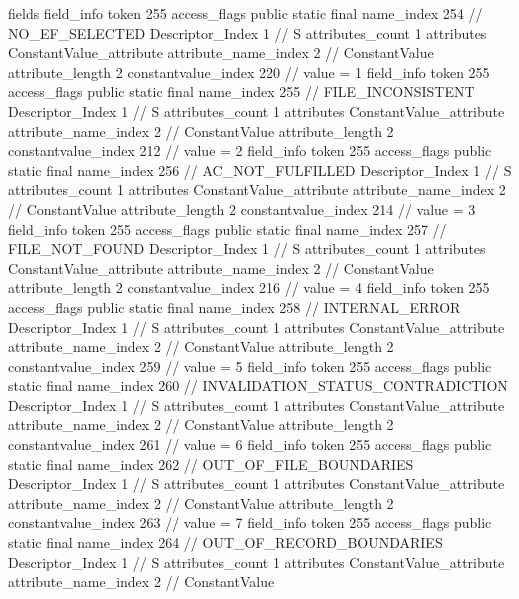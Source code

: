 {{{			fields {
			field_info {
				token	255
				access_flags	public static final
				name_index	254		// NO_EF_SELECTED
				Descriptor_Index	1		// S
				attributes_count	1
				attributes {
				ConstantValue_attribute {
					attribute_name_index	2		// ConstantValue
					attribute_length	2
					constantvalue_index	220		// value = 1
				}
				}
			}
			field_info {
				token	255
				access_flags	public static final
				name_index	255		// FILE_INCONSISTENT
				Descriptor_Index	1		// S
				attributes_count	1
				attributes {
				ConstantValue_attribute {
					attribute_name_index	2		// ConstantValue
					attribute_length	2
					constantvalue_index	212		// value = 2
				}
				}
			}
			field_info {
				token	255
				access_flags	public static final
				name_index	256		// AC_NOT_FULFILLED
				Descriptor_Index	1		// S
				attributes_count	1
				attributes {
				ConstantValue_attribute {
					attribute_name_index	2		// ConstantValue
					attribute_length	2
					constantvalue_index	214		// value = 3
				}
				}
			}
			field_info {
				token	255
				access_flags	public static final
				name_index	257		// FILE_NOT_FOUND
				Descriptor_Index	1		// S
				attributes_count	1
				attributes {
				ConstantValue_attribute {
					attribute_name_index	2		// ConstantValue
					attribute_length	2
					constantvalue_index	216		// value = 4
				}
				}
			}
			field_info {
				token	255
				access_flags	public static final
				name_index	258		// INTERNAL_ERROR
				Descriptor_Index	1		// S
				attributes_count	1
				attributes {
				ConstantValue_attribute {
					attribute_name_index	2		// ConstantValue
					attribute_length	2
					constantvalue_index	259		// value = 5
				}
				}
			}
			field_info {
				token	255
				access_flags	public static final
				name_index	260		// INVALIDATION_STATUS_CONTRADICTION
				Descriptor_Index	1		// S
				attributes_count	1
				attributes {
				ConstantValue_attribute {
					attribute_name_index	2		// ConstantValue
					attribute_length	2
					constantvalue_index	261		// value = 6
				}
				}
			}
			field_info {
				token	255
				access_flags	public static final
				name_index	262		// OUT_OF_FILE_BOUNDARIES
				Descriptor_Index	1		// S
				attributes_count	1
				attributes {
				ConstantValue_attribute {
					attribute_name_index	2		// ConstantValue
					attribute_length	2
					constantvalue_index	263		// value = 7
				}
				}
			}
			field_info {
				token	255
				access_flags	public static final
				name_index	264		// OUT_OF_RECORD_BOUNDARIES
				Descriptor_Index	1		// S
				attributes_count	1
				attributes {
				ConstantValue_attribute {
					attribute_name_index	2		// ConstantValue
}}}}}}}
